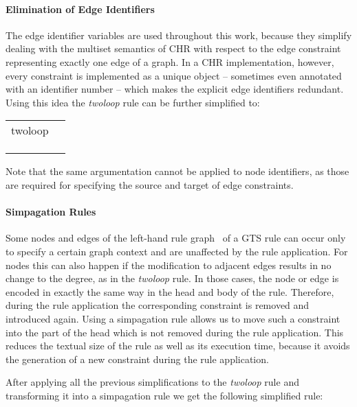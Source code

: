 \documentclass{tlp}
\begin{document}
\paragraph{Elimination of Edge Identifiers}

The edge identifier variables are used throughout this work, because they
simplify dealing with the multiset semantics of CHR with respect to the edge
constraint representing exactly one edge of a graph. In a CHR implementation,
however, every constraint is implemented as a unique object -- sometimes even
annotated with an identifier number -- which makes the explicit edge identifiers
redundant. Using this idea the \emph{twoloop} rule can be further simplified to:

\begin{center} 
\begin{tabular}{ll} 
twoloop  & \\
& \\
& \\
& 
\end{tabular}
\end{center}

Note that the same argumentation cannot be applied to node identifiers, as those
are required for specifying the source and target of edge constraints.

\paragraph{Simpagation Rules}

Some nodes and edges of the left-hand rule graph~ of a GTS rule can occur only
to specify a certain graph context and are unaffected by the rule application.
For nodes this can also happen if the modification to adjacent edges results in
no change to the degree, as in the \emph{twoloop} rule. In those cases, the node
or edge is encoded in exactly the same way in the head and body of the rule.
Therefore, during the rule application the corresponding constraint is removed
and introduced again. Using a simpagation rule allows us to move such a
constraint into the part of the head which is not removed during the rule
application. This reduces the textual size of the rule as well as its execution
time, because it avoids the generation of a new constraint during the rule
application.

After applying all the previous simplifications to the \emph{twoloop} rule and
transforming it into a simpagation rule we get the following simplified rule:
\end{document}
